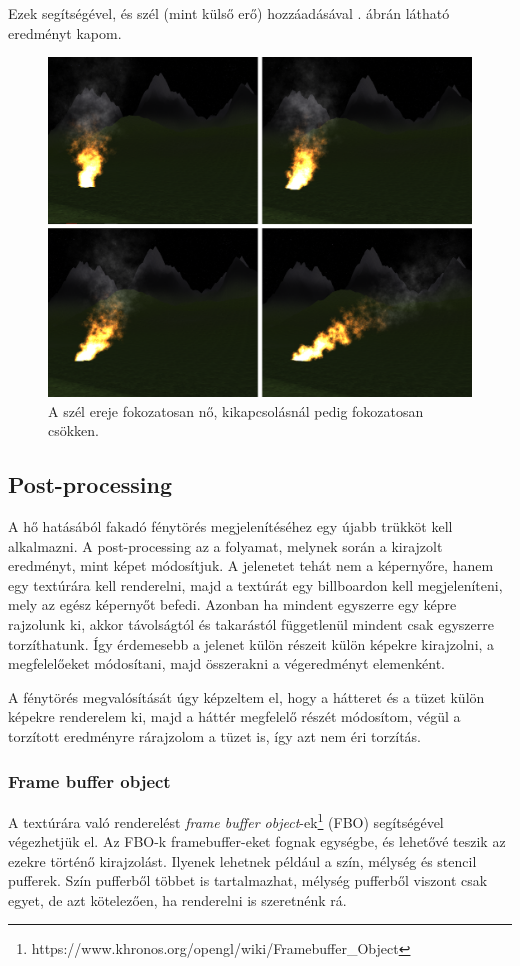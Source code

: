Ezek segítségével, és szél (mint külső erő) hozzáadásával . ábrán látható eredményt kapom.
\begin{figure}[h]
 \centering
 \includegraphics[width=\textwidth]{kepek/particleWind.png}
 \caption{A szél ereje fokozatosan nő, kikapcsolásnál pedig fokozatosan csökken.}
 \label{fig:particleWind}
\end{figure}

\subsection{Post-processing}
A hő hatásából fakadó fénytörés megjelenítéséhez egy újabb trükköt kell alkalmazni. A post-processing az a folyamat, melynek során a kirajzolt eredményt, mint képet módosítjuk. A jelenetet tehát nem a képernyőre, hanem egy textúrára kell renderelni, majd a textúrát egy billboardon kell megjeleníteni, mely az egész képernyőt befedi. Azonban ha mindent egyszerre egy képre rajzolunk ki, akkor távolságtól és takarástól függetlenül mindent csak egyszerre torzíthatunk. Így érdemesebb a jelenet külön részeit külön képekre kirajzolni, a megfelelőeket módosítani, majd összerakni a végeredményt elemenként.

A fénytörés megvalósítását úgy képzeltem el, hogy a hátteret és a tüzet külön képekre renderelem ki, majd a háttér megfelelő részét módosítom, végül a torzított eredményre rárajzolom a tüzet is, így azt nem éri torzítás.

\subsubsection{Frame buffer object}
A textúrára való renderelést \textit{frame buffer object}-ek\footnote{https://www.khronos.org/opengl/wiki/Framebuffer\_Object} (FBO) segítségével végezhetjük el. Az FBO-k framebuffer-eket fognak egységbe, és lehetővé teszik az ezekre történő kirajzolást. Ilyenek lehetnek például a szín, mélység és stencil pufferek. Szín pufferből többet is tartalmazhat, mélység pufferből viszont csak egyet, de azt kötelezően, ha renderelni is szeretnénk rá. 

